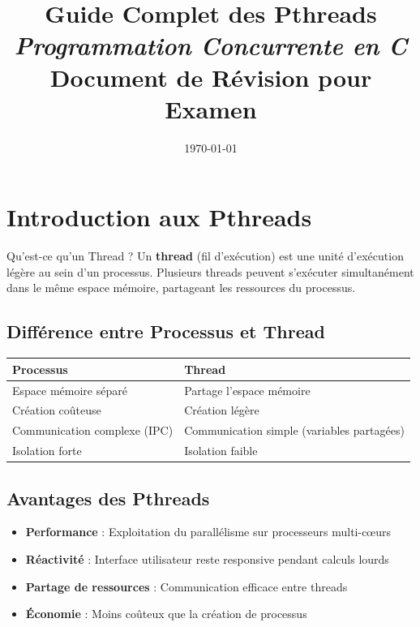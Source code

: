 \documentclass[11pt,a4paper]{article}
\title{
    \Huge\textbf{\color{titlecolor}Guide Complet des Pthreads}\\
    \Large\textit{Programmation Concurrente en C}\\
    \vspace{0.5cm}
    \large Document de Révision pour Examen
}
\author{}
\date{\today}
\begin{document}
\maketitle
\thispagestyle{empty}

\newpage
\tableofcontents
\newpage

\section{Introduction aux Pthreads}

\begin{definitionbox}{Qu'est-ce qu'un Thread ?}
Un \textbf{thread} (fil d'exécution) est une unité d'exécution légère au sein d'un processus. Plusieurs threads peuvent s'exécuter simultanément dans le même espace mémoire, partageant les ressources du processus.
\end{definitionbox}

\subsection{Différence entre Processus et Thread}

\begin{center}
\begin{tabular}{|p{5cm}|p{5cm}|}
\hline
\textbf{Processus} & \textbf{Thread} \\
\hline
Espace mémoire séparé & Partage l'espace mémoire \\
\hline
Création coûteuse & Création légère \\
\hline
Communication complexe (IPC) & Communication simple (variables partagées) \\
\hline
Isolation forte & Isolation faible \\
\hline
\end{tabular}
\end{center}

\subsection{Avantages des Pthreads}

\begin{itemize}[leftmargin=*]
    \item \textbf{Performance} : Exploitation du parallélisme sur processeurs multi-cœurs
    \item \textbf{Réactivité} : Interface utilisateur reste responsive pendant calculs lourds
    \item \textbf{Partage de ressources} : Communication efficace entre threads
    \item \textbf{Économie} : Moins coûteux que la création de processus
\end{itemize}
\end{document}
